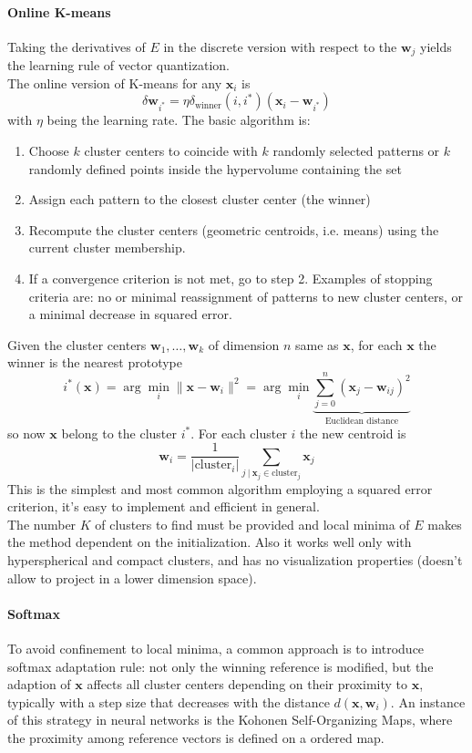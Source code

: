 \documentclass[10pt]{report}
\begin{document}
\paragraph{Online K-means} Taking the derivatives of $E$ in the discrete version with respect to the $\mathbf{w}_j$ yields the learning rule of vector quantization.\\
The online version of K-means for any $\mathbf{x}_i$ is $$\delta \mathbf{w}_{i^*} = \eta\delta_{\text{winner}}(i,i^*)(\mathbf{x}_i-\mathbf{w}_{i^*})$$
with $\eta$ being the learning rate. The basic algorithm is:
\begin{enumerate}
	\item Choose $k$ cluster centers to coincide with $k$ randomly selected patterns or $k$ randomly defined points inside the hypervolume containing the set
	\item Assign each pattern to the closest cluster center (the winner)
	\item Recompute the cluster centers (geometric centroids, i.e. means) using the current cluster membership.
	\item If a convergence criterion is not met, go to step 2. Examples of stopping criteria are: no or minimal reassignment of patterns to new cluster centers, or a minimal decrease in squared error.
\end{enumerate}
Given the cluster centers $\mathbf{w}_1,\ldots,\mathbf{w}_k$ of dimension $n$ same as $\mathbf{x}$, for each $\mathbf{x}$ the winner is the nearest prototype $$i^*(\mathbf{x}) = \arg\min_i\|\mathbf{x}-\mathbf{w}_i\|^2 = \arg\min_i\underset{\text{Euclidean distance}}{\underbrace{\sum_{j=0}^n(\mathbf{x}_j-\mathbf{w}_{ij})^2}}$$ so now $\mathbf{x}$ belong to the cluster $i^*$. For each cluster $i$ the new centroid is $$\mathbf{w}_i=\frac{1}{|\text{cluster}_i|}\sum_{j\:|\:\mathbf{x}_j\in\text{cluster}_j}\mathbf{x}_j$$
This is the simplest and most common algorithm employing a squared error criterion, it's easy to implement and efficient in general.\\
The number $K$ of clusters to find must be provided and local minima of $E$ makes the method dependent on the initialization. Also it works well only with hyperspherical and compact clusters, and has no visualization properties (doesn't allow to project in a lower dimension space).
\paragraph{Softmax} To avoid confinement to local minima, a common approach is to introduce softmax adaptation rule: not only the winning reference is modified, but the adaption of $\mathbf{x}$ affects all cluster centers depending on their proximity to $\mathbf{x}$, typically with a step size that decreases with the distance $d(\mathbf{x},\mathbf{w}_i)$. An instance of this strategy in neural networks is the Kohonen Self-Organizing Maps, where the proximity among reference vectors is defined on a ordered map.
\end{document}
